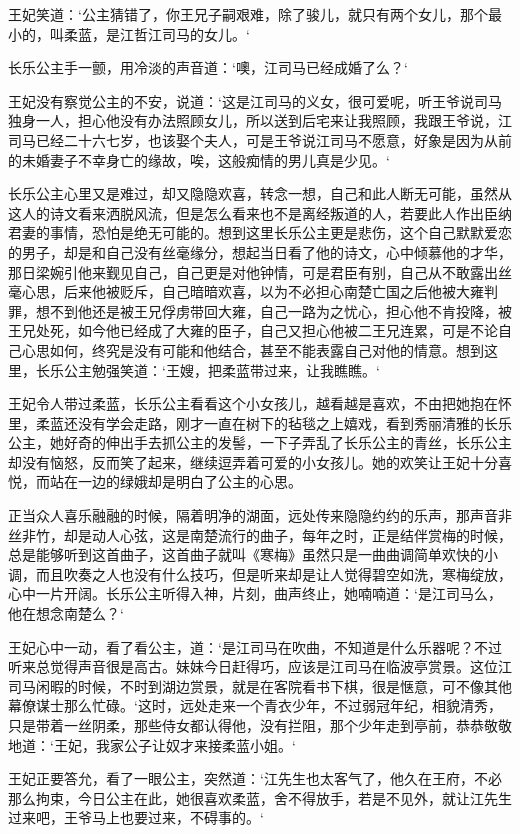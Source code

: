 王妃笑道：‘公主猜错了，你王兄子嗣艰难，除了骏儿，就只有两个女儿，那个最小的，叫柔蓝，是江哲江司马的女儿。‘

长乐公主手一颤，用冷淡的声音道：‘噢，江司马已经成婚了么？‘

王妃没有察觉公主的不安，说道：‘这是江司马的义女，很可爱呢，听王爷说司马独身一人，担心他没有办法照顾女儿，所以送到后宅来让我照顾，我跟王爷说，江司马已经二十六七岁，也该娶个夫人，可是王爷说江司马不愿意，好象是因为从前的未婚妻子不幸身亡的缘故，唉，这般痴情的男儿真是少见。‘

长乐公主心里又是难过，却又隐隐欢喜，转念一想，自己和此人断无可能，虽然从这人的诗文看来洒脱风流，但是怎么看来也不是离经叛道的人，若要此人作出臣纳君妻的事情，恐怕是绝无可能的。想到这里长乐公主更是悲伤，这个自己默默爱恋的男子，却是和自己没有丝毫缘分，想起当日看了他的诗文，心中倾慕他的才华，那日梁婉引他来觐见自己，自己更是对他钟情，可是君臣有别，自己从不敢露出丝毫心思，后来他被贬斥，自己暗暗欢喜，以为不必担心南楚亡国之后他被大雍判罪，想不到他还是被王兄俘虏带回大雍，自己一路为之忧心，担心他不肯投降，被王兄处死，如今他已经成了大雍的臣子，自己又担心他被二王兄连累，可是不论自己心思如何，终究是没有可能和他结合，甚至不能表露自己对他的情意。想到这里，长乐公主勉强笑道：‘王嫂，把柔蓝带过来，让我瞧瞧。‘

王妃令人带过柔蓝，长乐公主看看这个小女孩儿，越看越是喜欢，不由把她抱在怀里，柔蓝还没有学会走路，刚才一直在树下的毡毯之上嬉戏，看到秀丽清雅的长乐公主，她好奇的伸出手去抓公主的发髻，一下子弄乱了长乐公主的青丝，长乐公主却没有恼怒，反而笑了起来，继续逗弄着可爱的小女孩儿。她的欢笑让王妃十分喜悦，而站在一边的绿娥却是明白了公主的心思。

正当众人喜乐融融的时候，隔着明净的湖面，远处传来隐隐约约的乐声，那声音非丝非竹，却是动人心弦，这是南楚流行的曲子，每年之时，正是结伴赏梅的时候，总是能够听到这首曲子，这首曲子就叫《寒梅》虽然只是一曲曲调简单欢快的小调，而且吹奏之人也没有什么技巧，但是听来却是让人觉得碧空如洗，寒梅绽放，心中一片开阔。长乐公主听得入神，片刻，曲声终止，她喃喃道：‘是江司马么，他在想念南楚么？‘

王妃心中一动，看了看公主，道：‘是江司马在吹曲，不知道是什么乐器呢？不过听来总觉得声音很是高古。妹妹今日赶得巧，应该是江司马在临波亭赏景。这位江司马闲暇的时候，不时到湖边赏景，就是在客院看书下棋，很是惬意，可不像其他幕僚谋士那么忙碌。‘这时，远处走来一个青衣少年，不过弱冠年纪，相貌清秀，只是带着一丝阴柔，那些侍女都认得他，没有拦阻，那个少年走到亭前，恭恭敬敬地道：‘王妃，我家公子让奴才来接柔蓝小姐。‘

王妃正要答允，看了一眼公主，突然道：‘江先生也太客气了，他久在王府，不必那么拘束，今日公主在此，她很喜欢柔蓝，舍不得放手，若是不见外，就让江先生过来吧，王爷马上也要过来，不碍事的。‘

